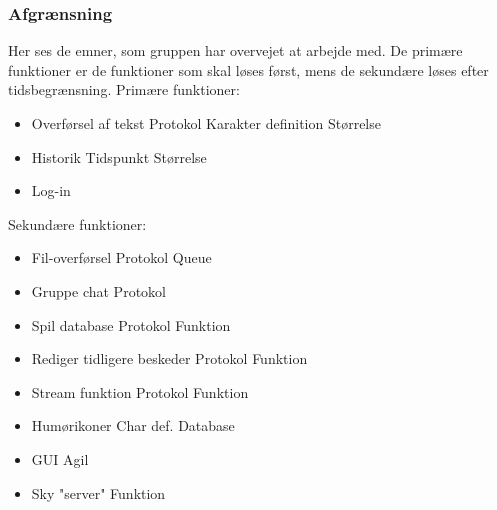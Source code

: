 \subsubsection{Afgrænsning}
Her ses de emner, som gruppen har overvejet at arbejde med. De primære funktioner er de funktioner som skal løses først, mens de sekundære løses efter tidsbegrænsning.
\newline
Primære funktioner:
\begin{itemize}
	\item Overførsel af tekst
		\subitem Protokol
		\subitem Karakter definition
		\subitem Størrelse
	\item Historik
		\subitem Tidspunkt
		\subitem Størrelse
	\item Log-in
\end{itemize}

Sekundære funktioner:
\begin{itemize}
	\item Fil-overførsel
		\subitem Protokol
		\subitem Queue
	\item Gruppe chat
		\subitem Protokol
	\item Spil database
		\subitem Protokol
		\subitem Funktion
	\item Rediger tidligere beskeder
		\subitem Protokol
		\subitem Funktion
	\item Stream funktion
		\subitem Protokol
		\subitem Funktion
	\item Humørikoner
		\subitem Char def.
		\subitem Database
	\item GUI
		\subitem Agil
	\item Sky "server"
		\subitem Funktion
\end{itemize}
